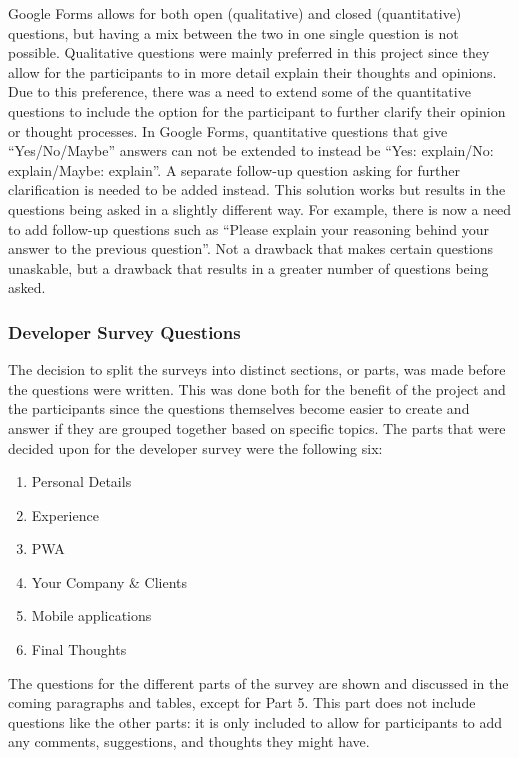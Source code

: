 \documentclass[a4paper,12pt]{article}
\begin{document}
Google Forms allows for both open (qualitative) and closed (quantitative) questions, but having a mix between the two in one single question is not possible. Qualitative questions were mainly preferred in this project since they allow for the participants to in more detail explain their thoughts and opinions. Due to this preference, there was a need to extend some of the quantitative questions to include the option for the participant to further clarify their opinion or thought processes. In Google Forms, quantitative questions that give “Yes/No/Maybe” answers can not be extended to instead be “Yes: explain/No: explain/Maybe: explain”. A separate follow-up question asking for further clarification is needed to be added instead. This solution works but results in the questions being asked in a slightly different way. For example, there is now a need to add follow-up questions such as “Please explain your reasoning behind your answer to the previous question”. Not a drawback that makes certain questions unaskable, but a drawback that results in a greater number of questions being asked.

\subsubsection{Developer Survey Questions}
\label{Project_surveyDesign_devQuestions}
The decision to split the surveys into distinct sections, or parts, was made before the questions were written. This was done both for the benefit of the project and the participants since the questions themselves become easier to create and answer if they are grouped together based on specific topics. The parts that were decided upon for the developer survey were the following six:

\begin{enumerate}
    \item Personal Details
    \item Experience
    \item PWA
    \item Your Company \& Clients
    \item Mobile applications
    \item Final Thoughts
\end{enumerate}

The questions for the different parts of the survey are shown and discussed in the coming paragraphs and tables, except for Part 5. This part does not include questions like the other parts: it is only included to allow for participants to add any comments, suggestions, and thoughts they might have.
\end{document}
